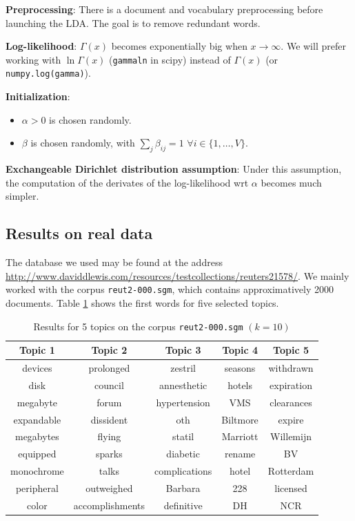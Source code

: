 \documentclass{article}
\begin{document}

\textbf{Preprocessing}: There is a document and vocabulary preprocessing before launching the LDA. The goal is to remove redundant words.

\textbf{Log-likelihood}: $\Gamma(x)$ becomes exponentially big when $x \rightarrow \infty$. We will prefer working with $\ln \Gamma(x)$ (\texttt{gammaln} in scipy) instead of $\Gamma(x)$ (or \texttt{numpy.log(gamma)}).

\textbf{Initialization}:
\begin{itemize}
\setlength\itemsep{-0.2em}
  \item $\alpha> 0$ is chosen randomly. %
  \item $\beta$ is chosen randomly, with $\sum_{j} \beta_{ij} = 1$ $\forall i \in \{1, \ldots, V\}$.
\end{itemize}

\textbf{Exchangeable Dirichlet distribution assumption}: Under this assumption, the computation of the derivates of the log-likelihood wrt $\alpha$ becomes much simpler.

\subsection{Results on real data}

The database we used may be found at the address \url{http://www.daviddlewis.com/resources/testcollections/reuters21578/}. We mainly worked with the corpus \texttt{reut2-000.sgm}, which contains approximatively 2000 documents. Table \ref{voc-result} shows the first words for five selected topics.

\begin{table}[ht!]
\begin{center}
\begin{tabular}{ccccc}
\hline
\textbf{Topic 1} & \textbf{Topic 2} & \textbf{Topic 3}  & \textbf{Topic 4} & \textbf{Topic 5}\\
\hline
devices & prolonged & zestril & seasons & withdrawn \\
disk & council & annesthetic &  hotels & expiration  \\
megabyte & forum & hypertension & VMS & clearances \\
expandable & dissident & oth & Biltmore  & expire \\
megabytes & flying & statil & Marriott & Willemijn \\
equipped &  sparks & diabetic & rename & BV \\
monochrome &talks & complications & hotel & Rotterdam  \\
peripheral & outweighed & Barbara & 228 & licensed \\
color & accomplishments & definitive & DH  & NCR \\
\hline
\end{tabular}
\caption{Results for 5 topics on the corpus \texttt{reut2-000.sgm} $(k=10)$}
\label{voc-result}
\end{center}
\end{table}
\end{document}
